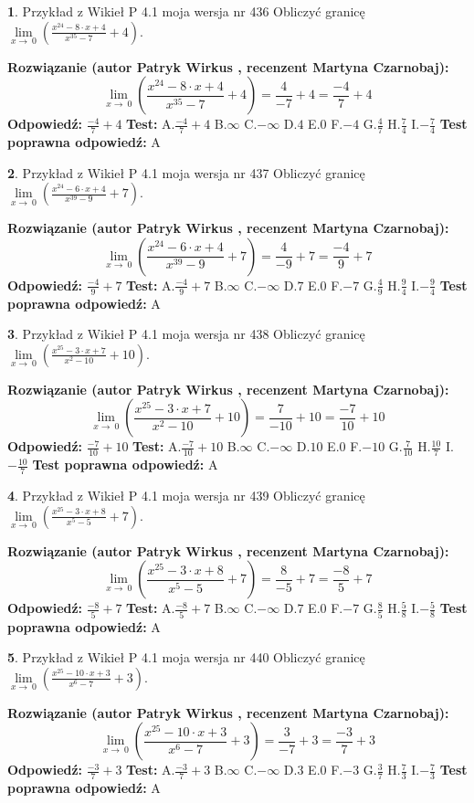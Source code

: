 \documentclass[12pt, a4paper]{article}
\theoremstyle{definition} %
\newtheorem{zad}{}
\newcommand{\zadStart}[1]{\begin{zad}#1\newline}
\newcommand{\zadStop}{\end{zad}}
\newcommand{\rozwStart}[2]{\noindent \textbf{Rozwiązanie (autor #1 , recenzent #2): }\newline}
\newcommand{\rozwStop}{\newline}
\newcommand{\odpStart}{\noindent \textbf{Odpowiedź:}\newline}
\newcommand{\odpStop}{\newline}
\newcommand{\testStart}{\noindent \textbf{Test:}\newline}
\newcommand{\testStop}{\newline}
\newcommand{\kluczStart}{\noindent \textbf{Test poprawna odpowiedź:}\newline}
\newcommand{\kluczStop}{\newline}
\begin{document}
\zadStart{Przykład z Wikieł P 4.1 moja wersja nr 436}
Obliczyć granicę $\lim\limits_{x\to\ 0}(\frac{x^{24}-8 \cdot x +4}{x^{35}-7}+4)$.
\zadStop
\rozwStart{Patryk Wirkus}{Martyna Czarnobaj}
$$\lim\limits_{x\to\ 0}(\frac{x^{24}-8 \cdot x +4}{x^{35}-7}+4)=\frac{4}{-7}+4=\frac{-4}{7}+4$$
\rozwStop
\odpStart
$\frac{-4}{7}+4$
\odpStop
\testStart
A.$\frac{-4}{7}+4$
B.$\infty$
C.$-\infty$
D.$4$
E.$0$
F.$-4$
G.$\frac{4}{7}$
H.$\frac{7}{4}$
I.$-\frac{7}{4}$
\testStop
\kluczStart
A
\kluczStop



\zadStart{Przykład z Wikieł P 4.1 moja wersja nr 437}
Obliczyć granicę $\lim\limits_{x\to\ 0}(\frac{x^{24}-6 \cdot x +4}{x^{39}-9}+7)$.
\zadStop
\rozwStart{Patryk Wirkus}{Martyna Czarnobaj}
$$\lim\limits_{x\to\ 0}(\frac{x^{24}-6 \cdot x +4}{x^{39}-9}+7)=\frac{4}{-9}+7=\frac{-4}{9}+7$$
\rozwStop
\odpStart
$\frac{-4}{9}+7$
\odpStop
\testStart
A.$\frac{-4}{9}+7$
B.$\infty$
C.$-\infty$
D.$7$
E.$0$
F.$-7$
G.$\frac{4}{9}$
H.$\frac{9}{4}$
I.$-\frac{9}{4}$
\testStop
\kluczStart
A
\kluczStop



\zadStart{Przykład z Wikieł P 4.1 moja wersja nr 438}
Obliczyć granicę $\lim\limits_{x\to\ 0}(\frac{x^{25}-3 \cdot x +7}{x^{2}-10}+10)$.
\zadStop
\rozwStart{Patryk Wirkus}{Martyna Czarnobaj}
$$\lim\limits_{x\to\ 0}(\frac{x^{25}-3 \cdot x +7}{x^{2}-10}+10)=\frac{7}{-10}+10=\frac{-7}{10}+10$$
\rozwStop
\odpStart
$\frac{-7}{10}+10$
\odpStop
\testStart
A.$\frac{-7}{10}+10$
B.$\infty$
C.$-\infty$
D.$10$
E.$0$
F.$-10$
G.$\frac{7}{10}$
H.$\frac{10}{7}$
I.$-\frac{10}{7}$
\testStop
\kluczStart
A
\kluczStop



\zadStart{Przykład z Wikieł P 4.1 moja wersja nr 439}
Obliczyć granicę $\lim\limits_{x\to\ 0}(\frac{x^{25}-3 \cdot x +8}{x^{5}-5}+7)$.
\zadStop
\rozwStart{Patryk Wirkus}{Martyna Czarnobaj}
$$\lim\limits_{x\to\ 0}(\frac{x^{25}-3 \cdot x +8}{x^{5}-5}+7)=\frac{8}{-5}+7=\frac{-8}{5}+7$$
\rozwStop
\odpStart
$\frac{-8}{5}+7$
\odpStop
\testStart
A.$\frac{-8}{5}+7$
B.$\infty$
C.$-\infty$
D.$7$
E.$0$
F.$-7$
G.$\frac{8}{5}$
H.$\frac{5}{8}$
I.$-\frac{5}{8}$
\testStop
\kluczStart
A
\kluczStop



\zadStart{Przykład z Wikieł P 4.1 moja wersja nr 440}
Obliczyć granicę $\lim\limits_{x\to\ 0}(\frac{x^{25}-10 \cdot x +3}{x^{6}-7}+3)$.
\zadStop
\rozwStart{Patryk Wirkus}{Martyna Czarnobaj}
$$\lim\limits_{x\to\ 0}(\frac{x^{25}-10 \cdot x +3}{x^{6}-7}+3)=\frac{3}{-7}+3=\frac{-3}{7}+3$$
\rozwStop
\odpStart
$\frac{-3}{7}+3$
\odpStop
\testStart
A.$\frac{-3}{7}+3$
B.$\infty$
C.$-\infty$
D.$3$
E.$0$
F.$-3$
G.$\frac{3}{7}$
H.$\frac{7}{3}$
I.$-\frac{7}{3}$
\testStop
\kluczStart
A
\kluczStop
\end{document}
